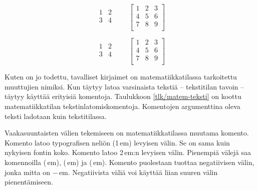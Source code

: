 \begin{koodilohkosis}
\[ \begin{matrix} 1 & 2 \\ 3 & 4 \\ \end{matrix} \qquad
   \begin{bmatrix}
     1 & 2 & 3 \\ 4 & 5 & 6 \\ 7 & 8 & 9 \\
   \end{bmatrix} \]
\end{koodilohkosis}
\[ \begin{matrix} 1 & 2 \\ 3 & 4 \\ \end{matrix} \qquad
  \begin{bmatrix}
    1 & 2 & 3 \\ 4 & 5 & 6 \\ 7 & 8 & 9 \\
  \end{bmatrix} \]


\noindent
Kuten on jo todettu, tavalliset kirjaimet on matematiikkatilassa
tarkoitettu muuttujien nimiksi. Kun täytyy latoa varsinaista tekstiä --
tekstitilan tavoin -- täytyy käyttää erityisiä komentoja. Taulukkoon
\ref{tlk/matem-teksti} on koottu matematiikkatilan
tekstinlatomiskomentoja. Komentojen argumenttina oleva teksti ladotaan
kuin tekstitilassa.

Vaakasuuntaisten välien tekemiseen on matematiikkatilassa muutama
komento. Komento  latoo typografisen neliön (1\,em)
levyisen välin. Se on sama kuin nykyisen fontin koko. Komento
 latoo 2\,em:n levyisen välin. Pienempiä välejä saa
komennoilla \mkomento{,} (\,em), \mkomento{:}
(\,em) ja \mkomento{;} (\,em). Komento
\mkomento{!} puolestaan tuottaa negatiivisen välin, jonka mitta on
−\,em. Negatiivista väliä voi käyttää liian suuren
välin pienentämiseen.

